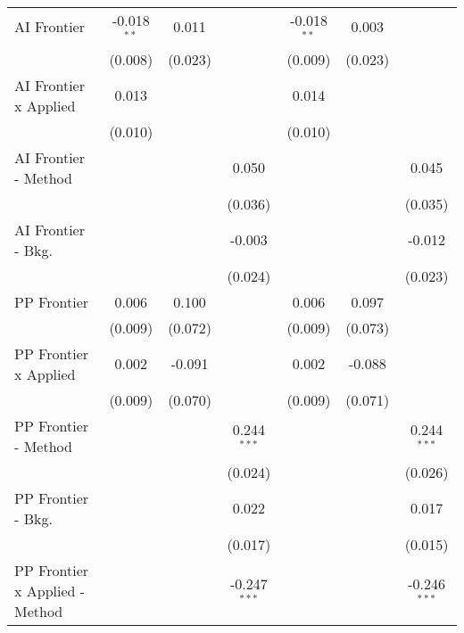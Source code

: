 \begin{tabular}{lcccccc}
   AI Frontier                    & -0.018$^{**}$  & 0.011   &                & -0.018$^{**}$  & 0.003   &   \\   
                                  & (0.008)        & (0.023) &                & (0.009)        & (0.023) &   \\   
   AI Frontier x Applied          & 0.013          &         &                & 0.014          &         &   \\   
                                  & (0.010)        &         &                & (0.010)        &         &   \\   
   AI Frontier - Method           &                &         & 0.050          &                &         & 0.045\\   
                                  &                &         & (0.036)        &                &         & (0.035)\\   
   AI Frontier - Bkg.             &                &         & -0.003         &                &         & -0.012\\   
                                  &                &         & (0.024)        &                &         & (0.023)\\   
   PP Frontier                    & 0.006          & 0.100   &                & 0.006          & 0.097   &   \\   
                                  & (0.009)        & (0.072) &                & (0.009)        & (0.073) &   \\   
   PP Frontier x Applied          & 0.002          & -0.091  &                & 0.002          & -0.088  &   \\   
                                  & (0.009)        & (0.070) &                & (0.009)        & (0.071) &   \\   
   PP Frontier - Method           &                &         & 0.244$^{***}$  &                &         & 0.244$^{***}$\\   
                                  &                &         & (0.024)        &                &         & (0.026)\\   
   PP Frontier - Bkg.             &                &         & 0.022          &                &         & 0.017\\   
                                  &                &         & (0.017)        &                &         & (0.015)\\   
   PP Frontier x Applied - Method &                &         & -0.247$^{***}$ &                &         & -0.246$^{***}$\\   

\end{tabular}
